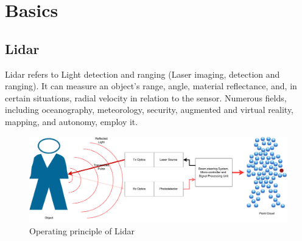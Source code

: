 \chapter{Basics}

\section{Lidar}
Lidar refers to Light detection and ranging (Laser imaging, detection and ranging). It can measure an object's range, angle, material reflectance, and, in certain situations, radial velocity in relation to the sensor. Numerous fields, including oceanography, meteorology, security, augmented and virtual reality, mapping, and autonomy, employ it.
\begin{figure}[htbp]
    \centering
    \includegraphics[width=0.8\linewidth]{97_graphics/related_work/lidar_principle.pdf}
    \caption{Operating principle of Lidar}
    \label{fig:related_work-lidar}
\end{figure}

